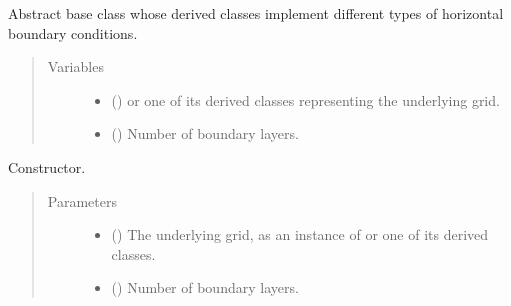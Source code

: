 \documentclass[letterpaper,10pt,english]{sphinxmanual}
\begin{document}
\begin{fulllineitems}
\label{\detokenize{api:dycore.horizontal_boundary.HorizontalBoundary}}
Abstract base class whose derived classes implement different types of horizontal boundary conditions.
\begin{quote}\begin{description}
\item[{Variables}] \leavevmode\begin{itemize}
\item {} 
 () \textendash{}  or one of its derived classes representing the underlying grid.

\item {} 
{\hyperref[\detokenize{api:dycore.prognostic_isentropic.PrognosticIsentropic.nb}]{}} () \textendash{} Number of boundary layers.

\end{itemize}

\end{description}\end{quote}

\begin{fulllineitems}
\label{\detokenize{api:dycore.horizontal_boundary.HorizontalBoundary.__init__}}
Constructor.
\begin{quote}\begin{description}
\item[{Parameters}] \leavevmode\begin{itemize}
\item {} 
 () \textendash{} The underlying grid, as an instance of {\hyperref[\detokenize{api:grids.grid_xyz.GridXYZ}]{}} or one of its derived classes.

\item {} 
 () \textendash{} Number of boundary layers.

\end{itemize}


\end{description}
\end{quote}
\end{fulllineitems}
\end{fulllineitems}
\end{document}
